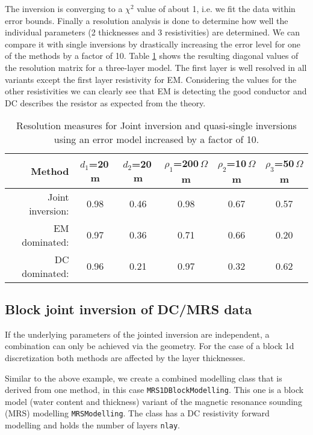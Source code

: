 The inversion is converging to a $\chi^2$ value of about 1, i.e. we fit the data within error bounds.
Finally a resolution analysis is done to determine how well the individual parameters (2 thicknesses and 3 resistivities) are determined.
We can compare it with single inversions by drastically increasing the error level for one of the methods by a factor of 10.
Table \ref{tab:dcemresolution} shows the resulting diagonal values of the resolution matrix for a three-layer model.
The first layer is well resolved in all variants except the first layer resistivity for EM.
Considering the values for the other resistivities we can clearly see that EM is detecting the good conductor and DC describes the resistor as expected from the theory.

\begin{table}[h]%
\centering
\begin{tabular}{r|ccccc}
Method & $d_1$=20\,m & $d_2$=20\,m & $\rho_1$=200\,$\Omega$m & $\rho_2$=10\,$\Omega$m & $\rho_3$=50\,$\Omega$m \\ \hline
Joint inversion: & 0.98 & 0.46 & 0.98 & 0.67 & 0.57 \\
EM dominated:    & 0.97 & 0.36 & 0.71 & 0.66 & 0.20 \\
DC dominated:    & 0.96 & 0.21 & 0.97 & 0.32 & 0.62  
\end{tabular}
\caption{Resolution measures for Joint inversion and quasi-single inversions using an error model increased by a factor of 10.}\label{tab:dcemresolution}
\end{table}

\subsection{Block joint inversion of DC/MRS data}\label{sec:blockjoint}
If the underlying parameters of the jointed inversion are independent, a combination can only be achieved via the geometry.
For the case of a block 1d discretization both methods are affected by the layer thicknesses.

Similar to the above example, we create a combined modelling class that is derived from one method, in this case \lstinline|MRS1DBlockModelling|.
This one is a block model (water content and thickness) variant of the magnetic resonance sounding (MRS) modelling \lstinline|MRSModelling|.
The class has a DC resistivity forward modelling and holds the number of layers \lstinline|nlay|.

